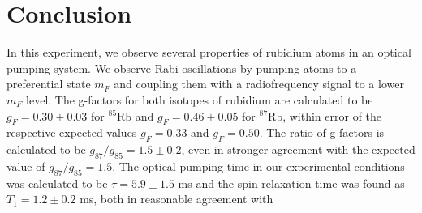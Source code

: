 
\section{Conclusion}\label{conclusion}

In this experiment, we observe several properties of rubidium atoms in an optical pumping system. We observe Rabi oscillations by pumping atoms to a preferential state $m_{F}$ and coupling them with a radiofrequency signal to a lower $m_{F}$ level. The g-factors for both isotopes of rubidium are calculated to be $g_{F}=0.30\pm0.03$ for $^{85}$Rb and $g_{F}=0.46\pm0.05$ for $^{87}$Rb, within error of the respective expected values $g_{F}=0.33$ and $g_{F}=0.50$. The ratio of g-factors is calculated to be $g_{87}/g_{85}=1.5\pm0.2$, even in stronger agreement with the expected value of $g_{87}/g_{85}=1.5$. The optical pumping time in our experimental conditions was calculated to be $\tau = 5.9\pm 1.5$ ms and the spin relaxation time was found as $T_{1}=1.2 \pm 0.2$ ms, both in reasonable agreement with 